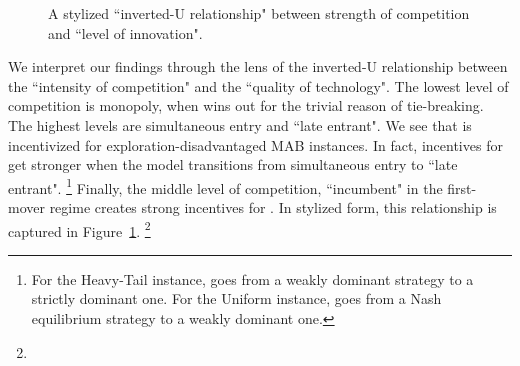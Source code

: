 \documentclass[../competing_bandits_with_appendix.tex]{subfiles}
\begin{document}
\begin{figure}[t]
\begin{center}
 \caption{A stylized ``inverted-U relationship" between strength of competition and ``level of innovation".}
\label{fig:inverted-U-expts}
\end{center}
\end{figure}

We interpret our findings through the lens of the inverted-U relationship between the ``intensity of competition" and the ``quality of technology". The lowest level of competition is monopoly, when \DG wins out for the trivial reason of tie-breaking. The highest levels are simultaneous entry and ``late entrant". We see that \DG is incentivized for exploration-disadvantaged MAB instances. In fact, incentives for \DG get stronger when the model transitions from simultaneous entry to ``late entrant".%
\footnote{For the Heavy-Tail instance, \DG goes from a weakly dominant strategy to a strictly dominant one. For the Uniform instance, \DG goes from a Nash equilibrium strategy to a weakly dominant one.}
Finally, the middle level of competition, ``incumbent" in the first-mover regime creates strong incentives for \TS. In stylized form, this relationship is captured in Figure~\ref{fig:inverted-U-expts}.%
\footnote{}


\end{document}
